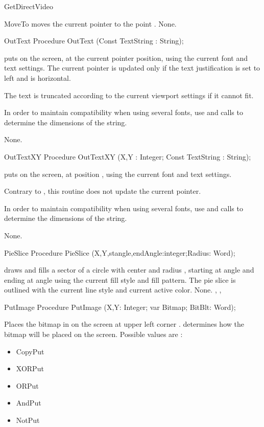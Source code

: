\begin{function}{GetDirectVideo}
\begin{procedure}{MoveTo}
\Description
{} moves the current pointer to the
point .
\Errors
None.
\SeeAlso
{}
\end{procedure}
\begin{procedure}{OutText}
\Declaration
Procedure OutText (Const TextString : String);

\Description
{} puts  on the screen, at the current pointer
position, using the current font and text settings. The current pointer is
updated only if the text justification is set to left and is horizontal.

The text is truncated according to the current viewport settings if it
cannot fit.

In order to maintain compatibility when using several fonts, use 
and  calls to determine the dimensions of the string.

\Errors
None.
\SeeAlso
{}
\end{procedure}
\begin{procedure}{OutTextXY}
\Declaration
Procedure OutTextXY (X,Y : Integer; Const TextString : String);

\Description
{} puts  on the screen, at position ,
using the current font and text settings.

Contrary to  , this routine does not update the current pointer.

In order to maintain compatibility when using several fonts, use 
and  calls to determine the dimensions of the string.

\Errors
None.
\SeeAlso
{}
\end{procedure}
\begin{procedure}{PieSlice}
\Declaration
Procedure PieSlice (X,Y,stangle,endAngle:integer;Radius: Word);

\Description
{}
draws and fills a sector of a circle with center  and radius
, starting at angle  and ending at angle 
using the current fill style and fill pattern. The pie slice is outlined
with the current line style and current active color.
\Errors
None.
\SeeAlso
{}, , 
\end{procedure}
\begin{procedure}{PutImage}
\Declaration
Procedure PutImage (X,Y: Integer; var Bitmap; BitBlt: Word);

\Description
{}
Places the bitmap in  on the screen at upper left
corner .  determines how the bitmap
will be placed on the screen. Possible values are :
\begin{itemize}
\item CopyPut
\item XORPut
\item ORPut
\item AndPut
\item NotPut
\end{itemize}


\end{procedure}
\end{function}
